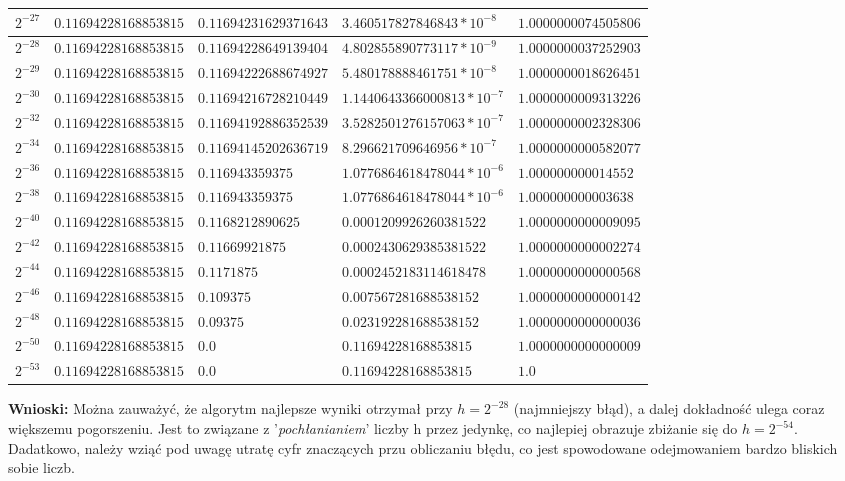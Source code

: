 \documentclass{article}
\begin{document}
\begin{longtable}{|p{}|p{}|p{}|p{4cm}|p{}|}
  \hline
  $2^{-27}$ & $0.11694228168853815 $ & $ 0.11694231629371643$ & $ 3.460517827846843*10^{-8}$ & $ 1.0000000074505806$ \\
  \hline
  $2^{-28}$ & $ 0.11694228168853815$ & $ 0.11694228649139404$ & $ 4.802855890773117*10^{-9}$ & $ 1.0000000037252903$ \\
  \hline
  $2^{-29}$ & $0.11694228168853815 $ & $ 0.11694222688674927$ & $ 5.480178888461751*10^{-8}$ & $ 1.0000000018626451$ \\
  \hline
  $2^{-30}$ & $0.11694228168853815 $ & $ 0.11694216728210449$ & $ 1.1440643366000813*10^{-7}$ & $ 1.0000000009313226$ \\
  \hline
  $2^{-32}$ & $0.11694228168853815 $ & $ 0.11694192886352539$ & $ 3.5282501276157063*10^{-7}$ & $ 1.0000000002328306$ \\
  \hline
  $2^{-34}$ & $0.11694228168853815 $ & $0.11694145202636719 $ & $8.296621709646956*10^{-7} $ & $ 1.0000000000582077$ \\
  \hline
  $2^{-36}$ & $0.11694228168853815 $ & $ 0.116943359375$ & $ 1.0776864618478044*10^{-6}$ & $ 1.000000000014552$ \\
  \hline
  $2^{-38}$ & $0.11694228168853815 $ & $0.116943359375 $ & $ 1.0776864618478044*10^{-6}$ & $ 1.000000000003638$ \\
  \hline
  $2^{-40}$ & $0.11694228168853815 $ & $ 0.1168212890625$ & $ 0.0001209926260381522$ & $ 1.0000000000009095$ \\
  \hline
  $2^{-42}$ & $0.11694228168853815 $ & $ 0.11669921875$ & $ 0.0002430629385381522$ & $ 1.0000000000002274$ \\
  \hline
  $2^{-44}$ & $0.11694228168853815 $ & $ 0.1171875$ & $ 0.0002452183114618478$ & $ 1.0000000000000568$ \\
  \hline
  $2^{-46}$ & $0.11694228168853815 $ & $ 0.109375$ & $ 0.007567281688538152$ & $ 1.0000000000000142$ \\
  \hline
  $2^{-48}$ & $ 0.11694228168853815$ & $ 0.09375$ & $ 0.023192281688538152$ & $ 1.0000000000000036$ \\
  \hline
  $2^{-50}$ & $0.11694228168853815 $ & $ 0.0$ & $ 0.11694228168853815$ & $ 1.0000000000000009$ \\
  \hline
  $2^{-53}$ & $0.11694228168853815 $ & $ 0.0$ & $ 0.11694228168853815$ & $ 1.0$ \\
  \hline
\end{longtable}
\noindent \textbf{Wnioski:} Można zauważyć, że algorytm najlepsze wyniki otrzymał przy $h = 2^{-28}$ (najmniejszy błąd), a dalej dokładność ulega coraz większemu pogorszeniu. Jest to związane z '\textit{pochłanianiem}' liczby h przez jedynkę, co najlepiej obrazuje zbiżanie się do  $h = 2^{-54}$. Dadatkowo, należy wziąć pod uwagę utratę cyfr znaczących przu obliczaniu błędu, co jest spowodowane odejmowaniem bardzo bliskich sobie liczb.
\end{document}
